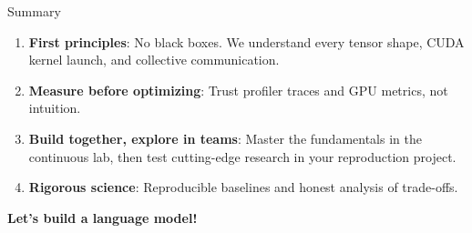 \documentclass[handout]{beamer}
\begin{document}
\begin{frame}{Summary}
  \begin{enumerate}
      \setlength{\itemsep}{9pt}
    \item \textbf{First principles}: No black boxes. We understand every tensor shape, CUDA kernel launch, and collective communication.
    \item \textbf{Measure before optimizing}: Trust profiler traces and GPU metrics, not intuition.
    \item \textbf{Build together, explore in teams}: Master the fundamentals in the continuous lab, then test cutting-edge research in your reproduction project.
    \item \textbf{Rigorous science}: Reproducible baselines and honest analysis of trade-offs.
  \end{enumerate}
  \vfill
  \centering\large\color{themenavy}\textbf{Let's build a language model!}
\end{frame}
\end{document}
